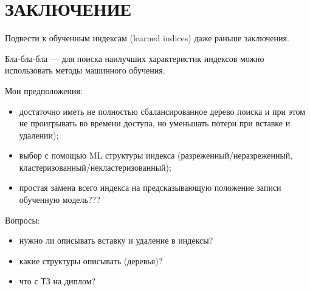 \chapter*{ЗАКЛЮЧЕНИЕ}

Подвести к обученным индексам (learned indices) даже раньше заключения.

Бла-бла-бла --- для поиска наилучших характеристик индексов можно использовать
методы машинного обучения.

Мои предположения:

\begin{itemize}
    \item достаточно иметь не полностью сбалансированное дерево поиска и при
        этом не проигрывать во времени доступа, но уменьшать потери при вставке
        и удалении);
    \item выбор с помощью ML структуры индекса (разреженный/неразреженный,
        кластеризованный/некластеризованный);
    \item простая замена всего индекса на предсказывающую положение записи
        обученную модель???
\end{itemize}

Вопросы:

\begin{itemize}
    \item нужно ли описывать вставку и удаление в индексы?
    \item какие структуры описывать (деревья)?
    \item что с ТЗ на диплом?
\end{itemize}

